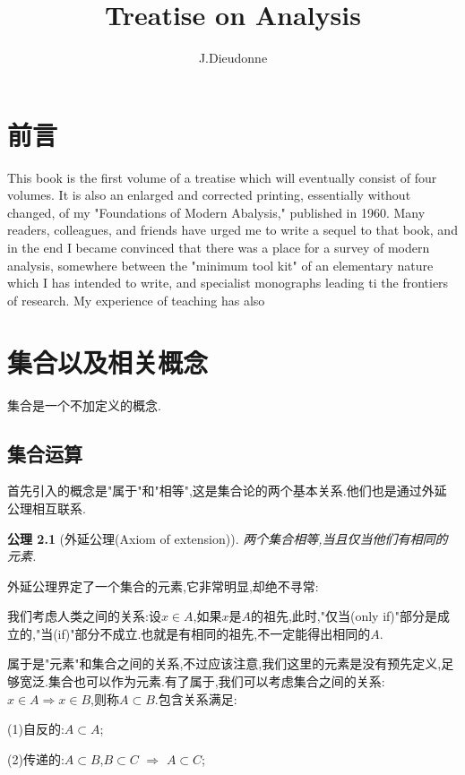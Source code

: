 \documentclass[12pt,a4paper,openany]{book}
\title{Treatise on Analysis}
\author{J.Dieudonne}
\newtheorem{axiom}{公理}[section]
\begin{document}
\frontmatter
\frontmatter
\begin{titlepage}
\maketitle
\end{titlepage}
\setcounter{page}{0}
\chapter{前言}
This book is the first volume of a treatise which will eventually consist of four volumes. It is also an enlarged and corrected printing, essentially without changed, of my "Foundations of Modern Abalysis," published in 1960. Many readers, colleagues, and friends have urged me to write a sequel to that book, and in the end I became convinced that there was a place for a survey of modern analysis, somewhere between the "minimum tool kit" of an elementary nature which I has intended to write, and specialist monographs leading ti the frontiers of research. My experience of teaching has also

\tableofcontents

\mainmatter
\chapter{集合以及相关概念}
集合是一个不加定义的概念.

\section{集合运算}
首先引入的概念是"属于"和"相等",这是集合论的两个基本关系.他们也是通过外延公理相互联系.

\begin{axiom}[外延公理(Axiom of extension)]
两个集合相等,当且仅当他们有相同的元素.
\end{axiom}

外延公理界定了一个集合的元素,它非常明显,却绝不寻常:

我们考虑人类之间的关系:设$x \in A$,如果$x$是$A$的祖先,此时,"仅当(only if)"部分是成立的,"当(if)"部分不成立.也就是有相同的祖先,不一定能得出相同的$A$.

属于是"元素"和集合之间的关系,不过应该注意,我们这里的元素是没有预先定义,足够宽泛.集合也可以作为元素.有了属于,我们可以考虑集合之间的关系:$x \in A \Rightarrow x \in B$,则称$A \subset B$.包含关系满足:

(1)自反的:$A \subset A$;

(2)传递的:$A \subset B$,$B \subset C$ $\Rightarrow$ $A \subset C$;
\end{document}
